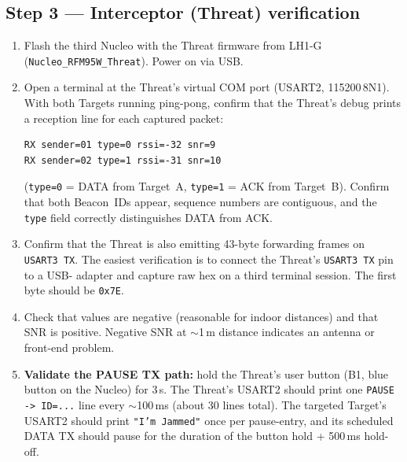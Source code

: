 \documentclass[11pt,letterpaper]{article}
\begin{document}
\subsection{Step 3 --- Interceptor (Threat) verification}
\begin{enumerate}[leftmargin=2em]
	\item Flash the third Nucleo with the Threat firmware from LH1-G (\texttt{Nucleo\_RFM95W\_Threat}). Power on via USB.
	\item Open a terminal at the Threat's virtual COM port (USART2, 115200\,8N1). With both Targets running ping-pong, confirm that the Threat's debug \UART{} prints a reception line for each captured packet:
	\begin{verbatim}
RX sender=01 type=0 rssi=-32 snr=9
RX sender=02 type=1 rssi=-31 snr=10
	\end{verbatim}
	(\texttt{type=0} = DATA from Target~A, \texttt{type=1} = ACK from Target~B). Confirm that both Beacon~IDs appear, sequence numbers are contiguous, and the \texttt{type} field correctly distinguishes DATA from ACK.
	\item Confirm that the Threat is also emitting 43-byte forwarding frames on \texttt{USART3 TX}. The easiest verification is to connect the Threat's \texttt{USART3 TX} pin to a USB-\UART{} adapter and capture raw hex on a third terminal session. The first byte should be \texttt{0x7E}.
	\item Check that \RSSI{} values are negative (reasonable for indoor distances) and that \mbox{SNR} is positive. Negative \mbox{SNR} at $\sim$1\,m distance indicates an antenna or front-end problem.
	\item \textbf{Validate the PAUSE TX path:} hold the Threat's user button (B1, blue button on the Nucleo) for 3\,s. The Threat's USART2 should print one \texttt{PAUSE -> ID=...} line every $\sim$100\,ms (about 30 lines total). The targeted Target's USART2 should print \texttt{"I'm Jammed"} once per pause-entry, and its scheduled DATA TX should pause for the duration of the button hold + 500\,ms hold-off.
\end{enumerate}

\end{document}
